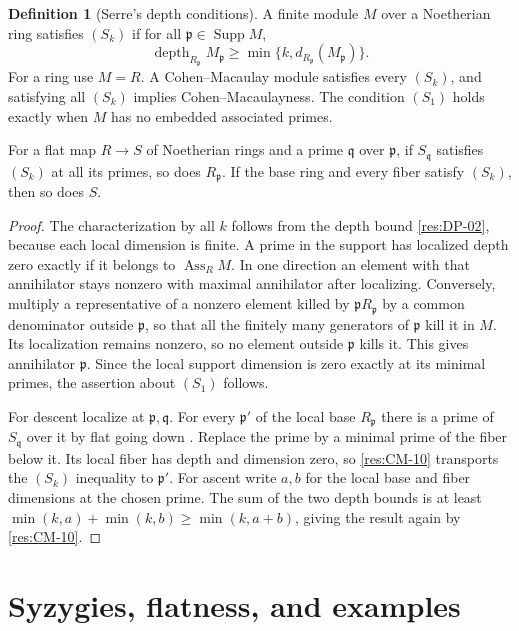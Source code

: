 \documentclass[11pt,oneside,openany]{book}
\theoremstyle{definition}
\newtheorem{definition}[theorem]{Definition}
\theoremstyle{remark}
\begin{document}
\begin{definition}[Serre's depth conditions]\label{res:CM-11}
A finite module $M$ over a Noetherian ring satisfies $(S_k)$
if for all $\mathfrak p\in\operatorname{Supp}M$,
\[
 \operatorname{depth}_{R_{\mathfrak p}}M_{\mathfrak p}
  \ge \min\{k,d_{R_{\mathfrak p}}(M_{\mathfrak p})\}.
\]
For a ring use $M=R$. A Cohen--Macaulay module satisfies
every $(S_k)$, and satisfying all $(S_k)$ implies
Cohen--Macaulayness. The condition $(S_1)$ holds exactly when
$M$ has no embedded associated primes.

For a flat map $R\to S$ of Noetherian rings and a prime
$\mathfrak q$ over $\mathfrak p$, if $S_{\mathfrak q}$
satisfies $(S_k)$ at all its primes, so does $R_{\mathfrak p}$.
If the base ring and every fiber satisfy $(S_k)$, then so
does $S$.
\end{definition}
\begin{proof}
The characterization by all $k$ follows from the depth
bound \ref{res:DP-02}, because each local dimension is finite.
A prime in the support has localized depth zero exactly if
it belongs to $\operatorname{Ass}_R M$. In one direction an
element with that annihilator stays nonzero with maximal
annihilator after localizing. Conversely, multiply a
representative of a nonzero element killed by
$\mathfrak pR_{\mathfrak p}$ by a common denominator
outside $\mathfrak p$, so that all the finitely many
generators of $\mathfrak p$ kill it in $M$. Its localization
remains nonzero, so no element outside $\mathfrak p$ kills
it. This gives annihilator $\mathfrak p$. Since the local
support dimension is zero exactly at its minimal primes,
the assertion about $(S_1)$ follows.

For descent localize at $\mathfrak p,\mathfrak q$. For every
$\mathfrak p'$ of the local base $R_{\mathfrak p}$ there
is a prime of $S_{\mathfrak q}$ over it by flat going down
\cite[Theorem ALG-05-C01-R04]{p103}. Replace the prime by
a minimal prime of the fiber below it. Its local fiber has
depth and dimension zero, so \ref{res:CM-10} transports the
$(S_k)$ inequality to $\mathfrak p'$. For ascent write
$a,b$ for the local base and fiber dimensions at the chosen
prime. The sum of the two depth bounds is at least
$\min(k,a)+\min(k,b)\ge\min(k,a+b)$, giving the result again
by \ref{res:CM-10}.
\end{proof}

\section{Syzygies, flatness, and examples}
\end{document}
